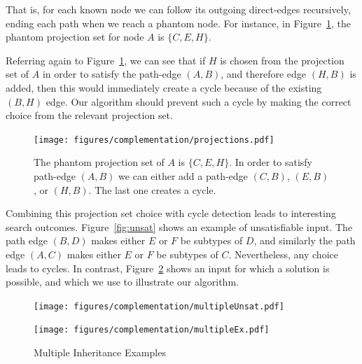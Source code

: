 That is, for each known node we can follow its outgoing direct-edges
recursively, ending each path when we reach a phantom node. For
instance, in Figure~\ref{fig:proj}, the phantom projection set for
node $A$ is $\{C,E,H\}$.


Referring again to Figure~\ref{fig:proj}, we can see that if $H$ is
chosen from the projection set of $A$ in order to satisfy the
path-edge $(A,B)$, and therefore edge $(H,B)$ is added, then this
would immediately create a cycle because of the existing $(B,H)$
edge. Our algorithm should prevent such a cycle by making the correct
choice from the relevant projection set.

\begin{figure}[tp]
  \centering
    \texttt{[image: figures/complementation/projections.pdf]}
  \caption[Phantom Projection Set]{%
    The phantom projection set of $A$ is $\{C,E,H\}$. In order to
    satisfy path-edge $(A,B)$ we can either add a path-edge $(C,B)$,
    $(E,B)$, or $(H,B)$. The last one creates a cycle.
  }
\label{fig:proj}
\end{figure}


Combining this projection set choice with cycle detection leads to
interesting search outcomes. Figure~\ref{fig:unsat} shows an example
of unsatisfiable input. The path edge $(B,D)$ makes either $E$ or $F$
be subtypes of $D$, and similarly the path edge $(A,C)$ makes either
$E$ or $F$ be subtypes of $C$. Nevertheless, any choice leads to
cycles. In contrast, Figure~\ref{fig:multipleHard} shows an input for
which a solution is possible, and which we use to illustrate our
algorithm.

\begin{figure}[htp]
  \begin{minipage}[b]{.5\linewidth}
    \centering
    \texttt{[image: figures/complementation/multipleUnsat.pdf]}
    \label{fig:unsat}
  \end{minipage}
  \begin{minipage}[b]{.5\linewidth}
    \centering
    \texttt{[image: figures/complementation/multipleEx.pdf]}
    \label{fig:multipleHard}
  \end{minipage}
  \caption{Multiple Inheritance Examples}
\end{figure}

